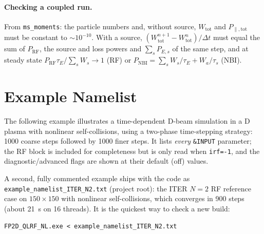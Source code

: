 \documentclass[11pt,a4paper]{article}
\begin{document}
\paragraph{Checking a coupled run.}  From \texttt{ms\_moments}: the particle numbers and, without
source, $W_\mathrm{tot}$ and $P_{\parallel,\mathrm{tot}}$ must be constant to $\sim10^{-10}$.  With a source,
$(W^{n+1}_\mathrm{tot}-W^n_\mathrm{tot})/\Delta t$ must equal the sum of $P_\mathrm{RF}$, the source and loss
powers and $\sum_sP_{E,s}$ of the same step, and at steady state $P_\mathrm{RF}\tau_E/\sum_sW_s\to1$
(RF) or $P_\mathrm{NBI}=\sum_sW_s/\tau_E+W_a/\tau_s$ (NBI).


\section{Example Namelist}

The following example illustrates a time-dependent D-beam simulation in a D
plasma with nonlinear self-collisions, using a two-phase time-stepping
strategy: 1000 coarse steps followed by 1000 finer steps. It lists \emph{every}
\texttt{\&INPUT} parameter; the RF block is included for completeness but is only
read when \texttt{irf=-1}, and the diagnostic/advanced flags are shown at their
default (off) values.

A second, fully commented example ships with the code as
\texttt{example\_namelist\_ITER\_N2.txt} (project root): the ITER $N=2$ RF
reference case on $150\times150$ with nonlinear self-collisions, which converges
in 900 steps (about 21~s on 16 threads).  It is the quickest way to check a new
build:
\begin{lstlisting}
FP2D_QLRF_NL.exe < example_namelist_ITER_N2.txt
\end{lstlisting}
\end{document}
